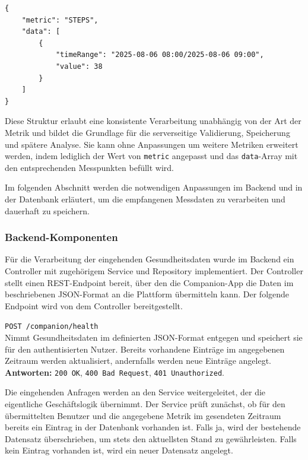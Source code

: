 \documentclass[12pt,a4paper]{report}
\begin{document}
\begin{verbatim}
{
    "metric": "STEPS",
    "data": [
        {
            "timeRange": "2025-08-06 08:00/2025-08-06 09:00",
            "value": 38
        }
    ]
}
\end{verbatim}

Diese Struktur erlaubt eine konsistente Verarbeitung unabhängig von der Art der Metrik und bildet die Grundlage für die
serverseitige Validierung, Speicherung und spätere Analyse. Sie kann ohne Anpassungen um weitere Metriken erweitert werden,
indem lediglich der Wert von \texttt{metric} angepasst und das \texttt{data}-Array mit den entsprechenden Messpunkten befüllt
wird.

Im folgenden Abschnitt werden die notwendigen Anpassungen im Backend und in der Datenbank erläutert, um die empfangenen
Messdaten zu verarbeiten und dauerhaft zu speichern.

\subsubsection{Backend-Komponenten}

Für die Verarbeitung der eingehenden Gesundheitsdaten wurde im Backend ein Controller mit zugehörigem Service und Repository
implementiert. Der Controller stellt einen REST-Endpoint bereit, über den die Companion-App die Daten im beschriebenen 
JSON-Format an die Plattform übermitteln kann. Der folgende Endpoint wird von dem Controller bereitgestellt.

\begin{description}
  \item \texttt{POST /companion/health} \\
        Nimmt Gesundheitsdaten im definierten JSON-Format entgegen und speichert sie für den authentisierten Nutzer. 
        Bereits vorhandene Einträge im angegebenen Zeitraum werden aktualisiert, andernfalls werden neue Einträge angelegt. \\
        \textbf{Antworten:} \texttt{200 OK}, \texttt{400 Bad Request}, \texttt{401 Unauthorized}.
\end{description}

Die eingehenden Anfragen werden an den Service weitergeleitet, der die eigentliche Geschäftslogik übernimmt. Der Service prüft
zunächst, ob für den übermittelten Benutzer und die angegebene Metrik im gesendeten Zeitraum bereits ein Eintrag in der Datenbank
vorhanden ist. Falls ja, wird der bestehende Datensatz überschrieben, um stets den aktuellsten Stand zu gewährleisten. Falls kein
Eintrag vorhanden ist, wird ein neuer Datensatz angelegt.  
\end{document}
